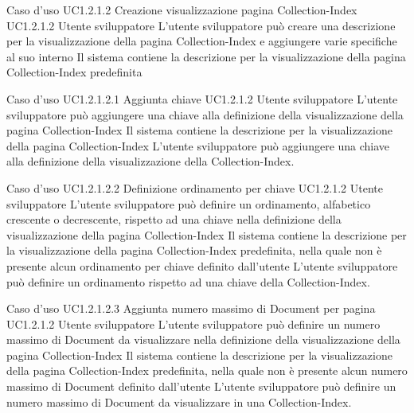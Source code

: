 \UCtitle
{Caso d'uso UC1.2.1.2}
{Creazione visualizzazione pagina Collection-Index}
\UC
{UC1.2.1.2}
{Utente sviluppatore}
{L'utente sviluppatore  può creare una descrizione per la visualizzazione della pagina Collection-Index e aggiungere varie specifiche al suo interno}
{Il sistema contiene la descrizione per la visualizzazione della pagina Collection-Index predefinita}


\UCtitle
{Caso d'uso UC1.2.1.2.1}
{Aggiunta chiave}
\UC
{UC1.2.1.2}
{Utente sviluppatore}
{L'utente sviluppatore  può aggiungere una chiave alla definizione della visualizzazione della pagina Collection-Index}
{Il sistema contiene la descrizione per la visualizzazione della pagina Collection-Index}
\scenario
{L'utente sviluppatore può aggiungere una chiave alla definizione della visualizzazione della Collection-Index.}


\UCtitle
{Caso d'uso UC1.2.1.2.2}
{Definizione ordinamento per chiave}
\UC
{UC1.2.1.2}
{Utente sviluppatore}
{L'utente sviluppatore  può  definire un ordinamento, alfabetico crescente o decrescente, rispetto ad una chiave nella definizione della visualizzazione della pagina Collection-Index}
{Il sistema contiene la descrizione per la visualizzazione della pagina Collection-Index predefinita, nella quale non è presente alcun ordinamento per chiave definito dall'utente}
\scenario
{L'utente sviluppatore può definire un ordinamento rispetto ad una chiave della Collection-Index.}

\UCtitle
{Caso d'uso UC1.2.1.2.3}
{Aggiunta numero massimo di Document per pagina}
\UC
{UC1.2.1.2}
{Utente sviluppatore}
{L'utente sviluppatore  può definire un numero massimo di Document da visualizzare nella definizione della visualizzazione della pagina Collection-Index}
{Il sistema contiene la descrizione per la visualizzazione della pagina Collection-Index predefinita, nella quale non è presente alcun numero massimo di Document definito dall'utente}
\scenario
{L'utente sviluppatore può definire un numero massimo di Document da visualizzare in una Collection-Index.}

